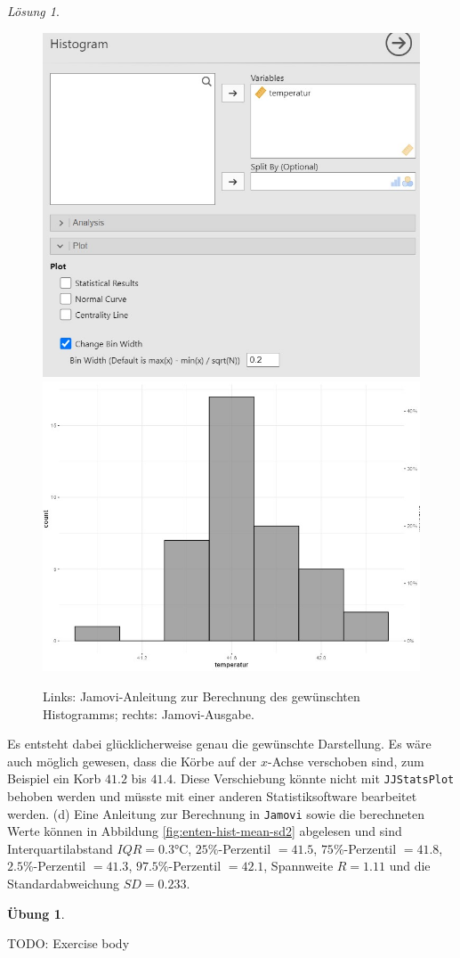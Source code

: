 \documentclass[
]{book}
\theoremstyle{definition}
\theoremstyle{definition}
\theoremstyle{definition}
\newtheorem{exercise}{Übung}[chapter]
\theoremstyle{definition}
\theoremstyle{remark}
\newtheorem*{solution}{Lösung}
\begin{document}
\begin{solution}
\begin{figure}
\includegraphics[width=0.5\linewidth]{figures/02-exr-enten-hist-binwidth-jmv-input} \includegraphics[width=0.5\linewidth]{figures/02-exr-enten-hist-binwidth-jmv-output} \caption{Links: Jamovi-Anleitung zur Berechnung des gewünschten Histogramms; rechts: Jamovi-Ausgabe.}\label{fig:enten-hist-binwidth}
\end{figure}

Es entsteht dabei glücklicherweise genau die gewünschte Darstellung. Es wäre auch möglich gewesen, dass die Körbe auf der \(x\)-Achse verschoben sind, zum Beispiel ein Korb \(41.2\) bis \(41.4\). Diese Verschiebung könnte nicht mit \texttt{JJStatsPlot} behoben werden und müsste mit einer anderen Statistiksoftware bearbeitet werden.
(d) Eine Anleitung zur Berechnung in \texttt{Jamovi} sowie die berechneten Werte können in Abbildung \ref{fig:enten-hist-mean-sd2} abgelesen und sind Interquartilabstand \(IQR= 0.3\)°C, \(25\%\)-Perzentil \(=41.5\), \(75\%\)-Perzentil \(=41.8\), \(2.5\%\)-Perzentil \(=41.3\), \(97.5\%\)-Perzentil \(= 42.1\), Spannweite \(R=1.11\) und die Standardabweichung \(SD = 0.233\).

\end{solution}

\begin{exercise}
\protect\hypertarget{exr:temptag-pvai8hwv}{}\label{exr:temptag-pvai8hwv}\leavevmode

TODO: Exercise body

\end{exercise}
\end{document}
